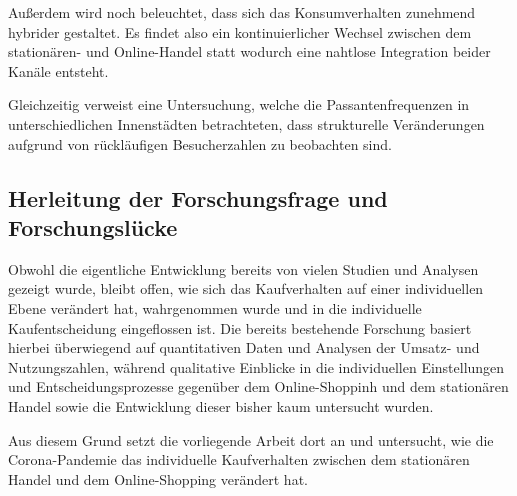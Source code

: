 Außerdem wird noch beleuchtet, dass sich das Konsumverhalten zunehmend hybrider gestaltet. Es findet also ein kontinuierlicher Wechsel zwischen dem stationären- und Online-Handel statt wodurch eine nahtlose Integration beider Kanäle entsteht.

Gleichzeitig verweist eine Untersuchung, welche die Passantenfrequenzen in unterschiedlichen Innenstädten betrachteten, dass strukturelle Veränderungen aufgrund von rückläufigen Besucherzahlen zu beobachten sind.

\subsection{Herleitung der Forschungsfrage und Forschungslücke}
Obwohl die eigentliche Entwicklung bereits von vielen Studien und Analysen gezeigt wurde, bleibt offen, wie sich das Kaufverhalten auf einer individuellen Ebene verändert hat, wahrgenommen wurde und in die individuelle Kaufentscheidung eingeflossen ist. Die bereits bestehende Forschung basiert hierbei überwiegend auf quantitativen Daten und Analysen der Umsatz- und Nutzungszahlen, während qualitative Einblicke in die individuellen Einstellungen und Entscheidungsprozesse gegenüber dem Online-Shoppinh und dem stationären Handel sowie die Entwicklung dieser bisher kaum untersucht wurden. 

Aus diesem Grund setzt die vorliegende Arbeit dort an und untersucht, wie die Corona-Pandemie das individuelle Kaufverhalten zwischen dem stationären Handel und dem Online-Shopping verändert hat. 